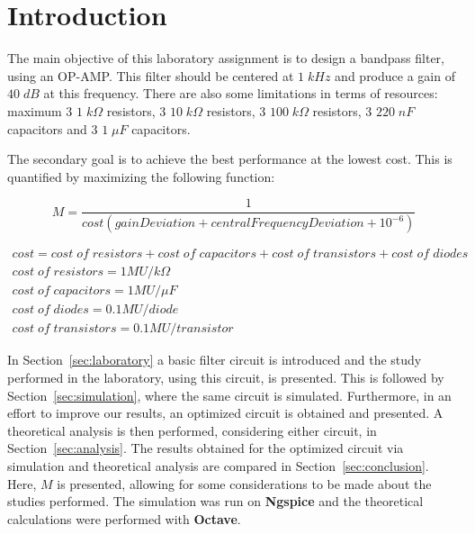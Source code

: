 \newpage

\section{Introduction}
\label{sec:introduction}

The main objective of this laboratory assignment is to design a bandpass filter, using an OP-AMP. This filter should be centered at $1\;kHz$ and produce a gain of $40\;dB$ at this frequency. There are also some limitations in terms of resources: maximum 3 $1\;k\Omega$ resistors, 3 $10\;k\Omega$ resistors, 3 $100\;k\Omega$ resistors, 3 $220\;nF$ capacitors and 3 $1\;\mu F$ capacitors. 

The secondary goal is to achieve the best performance at the lowest cost. This is quantified by maximizing the following function:

\begin{equation}
  M = \frac{1}{cost (gainDeviation + centralFrequencyDeviation + 10^{-6})}
\end{equation}

\begin{gather*}
  cost = cost\;of\;resistors + cost\;of\;capacitors + cost\;of\;transistors + cost\;of\;diodes \\
  cost\;of\;resistors = 1 MU/k\Omega \\
  cost\;of\;capacitors = 1 MU/\mu F \\
  cost\;of\;diodes = 0.1 MU/diode \\
  cost\;of\;transistors = 0.1 MU/transistor
\end{gather*}

In Section~\ref{sec:laboratory} a basic filter circuit is introduced and the study performed in the laboratory, using this circuit, is presented. This is followed by Section~\ref{sec:simulation}, where the same circuit is simulated. Furthermore, in an effort to improve our results, an optimized circuit is obtained and presented. A theoretical analysis is then performed, considering either circuit, in Section~\ref{sec:analysis}. The results obtained for the optimized circuit via simulation and theoretical analysis are compared in Section~\ref{sec:conclusion}. Here, $M$ is presented, allowing for some considerations to be made about the studies performed. The simulation was run on {\bf Ngspice} and the theoretical calculations were performed with {\bf Octave}.

